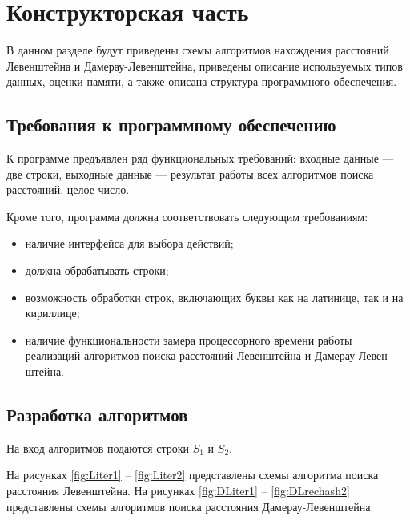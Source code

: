 \chapter{Конструкторская часть}

В данном разделе будут приведены схемы алгоритмов нахождения расстояний Левенштейна и Дамерау-Левенштейна, приведены описание используемых типов данных, оценки памяти, а также описана структура программного обеспечения.

\section{Требования к программному обеспечению}\label{section:requirements}

К программе предъявлен ряд функциональных требований: входные данные --- две строки, выходные данные --- результат работы всех алгоритмов поиска расстояний, целое число.

Кроме того, программа должна соответствовать следующим требованиям:
\begin{itemize}[label=---]
	\item наличие интерфейса для выбора действий;
	\item должна обрабатывать строки;
	\item возможность обработки строк, включающих буквы как на латинице, так и на кириллице;
	\item наличие функциональности замера процессорного времени работы реализаций алгоритмов поиска расстояний Левенштейна и Дамерау-Левен- штейна.
\end{itemize}

\section{Разработка алгоритмов}

На вход алгоритмов подаются строки $S_1$ и $S_2$.

На рисунках \ref{fig:Liter1} -- \ref{fig:Liter2} представлены схемы алгоритма поиска расстояния Левенштейна.
На рисунках \ref{fig:DLiter1} -- \ref{fig:DLrechash2} представлены схемы алгоритмов поиска расстояния Дамерау-Левенштейна.

